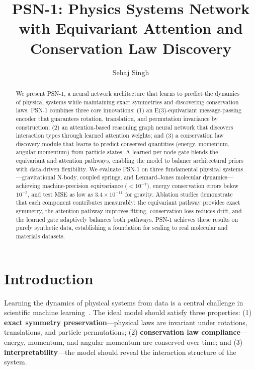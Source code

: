 \documentclass[10pt,twocolumn]{article}
\title{PSN-1: Physics Systems Network with Equivariant Attention and Conservation Law Discovery}
\author{Sehaj Singh}
\date{}
\begin{document}
\maketitle

\begin{abstract}
We present PSN-1, a neural network architecture that learns to predict the dynamics of physical systems while maintaining exact symmetries and discovering conservation laws. PSN-1 combines three core innovations: (1) an E(3)-equivariant message-passing encoder that guarantees rotation, translation, and permutation invariance by construction; (2) an attention-based reasoning graph neural network that discovers interaction types through learned attention weights; and (3) a conservation law discovery module that learns to predict conserved quantities (energy, momentum, angular momentum) from particle states. A learned per-node gate blends the equivariant and attention pathways, enabling the model to balance architectural priors with data-driven flexibility. We evaluate PSN-1 on three fundamental physical systems---gravitational N-body, coupled springs, and Lennard-Jones molecular dynamics---achieving machine-precision equivariance ($< 10^{-7}$), energy conservation errors below $10^{-5}$, and test MSE as low as $3.4 \times 10^{-11}$ for gravity. Ablation studies demonstrate that each component contributes measurably: the equivariant pathway provides exact symmetry, the attention pathway improves fitting, conservation loss reduces drift, and the learned gate adaptively balances both pathways. PSN-1 achieves these results on purely synthetic data, establishing a foundation for scaling to real molecular and materials datasets.
\end{abstract}

\section{Introduction}
\label{sec:intro}

Learning the dynamics of physical systems from data is a central challenge in scientific machine learning~\cite{raissi2019physics}. The ideal model should satisfy three properties: (1) \textbf{exact symmetry preservation}---physical laws are invariant under rotations, translations, and particle permutations; (2) \textbf{conservation law compliance}---energy, momentum, and angular momentum are conserved over time; and (3) \textbf{interpretability}---the model should reveal the interaction structure of the system.
\end{document}
